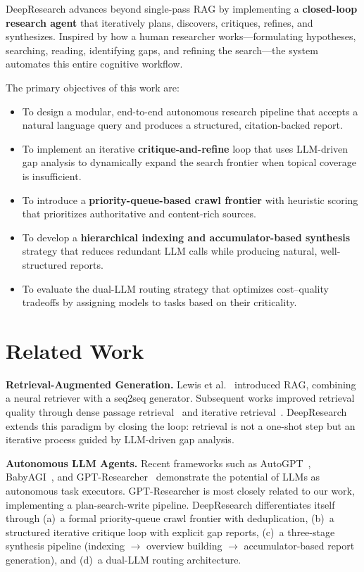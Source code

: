 \documentclass[conference]{IEEEtran}
\begin{document}
DeepResearch advances beyond single-pass RAG by implementing a \textbf{closed-loop research agent} that iteratively plans, discovers, critiques, refines, and synthesizes. Inspired by how a human researcher works---formulating hypotheses, searching, reading, identifying gaps, and refining the search---the system automates this entire cognitive workflow.

The primary objectives of this work are:
\begin{itemize}
    \item To design a modular, end-to-end autonomous research pipeline that accepts a natural language query and produces a structured, citation-backed report.
    \item To implement an iterative \textbf{critique-and-refine} loop that uses LLM-driven gap analysis to dynamically expand the search frontier when topical coverage is insufficient.
    \item To introduce a \textbf{priority-queue-based crawl frontier} with heuristic scoring that prioritizes authoritative and content-rich sources.
    \item To develop a \textbf{hierarchical indexing and accumulator-based synthesis} strategy that reduces redundant LLM calls while producing natural, well-structured reports.
    \item To evaluate the dual-LLM routing strategy that optimizes cost--quality tradeoffs by assigning models to tasks based on their criticality.
\end{itemize}

\section{Related Work}

\textbf{Retrieval-Augmented Generation.} Lewis et al.~\cite{lewis2020rag} introduced RAG, combining a neural retriever with a seq2seq generator. Subsequent works improved retrieval quality through dense passage retrieval~\cite{karpukhin2020dense} and iterative retrieval~\cite{trivedi2023interleaving}. DeepResearch extends this paradigm by closing the loop: retrieval is not a one-shot step but an iterative process guided by LLM-driven gap analysis.

\textbf{Autonomous LLM Agents.} Recent frameworks such as AutoGPT~\cite{autogpt2023}, BabyAGI~\cite{babyagi2023}, and GPT-Researcher~\cite{gptresearcher2023} demonstrate the potential of LLMs as autonomous task executors. GPT-Researcher is most closely related to our work, implementing a plan-search-write pipeline. DeepResearch differentiates itself through (a)~a formal priority-queue crawl frontier with deduplication, (b)~a structured iterative critique loop with explicit gap reports, (c)~a three-stage synthesis pipeline (indexing $\to$ overview building $\to$ accumulator-based report generation), and (d)~a dual-LLM routing architecture.
\end{document}
